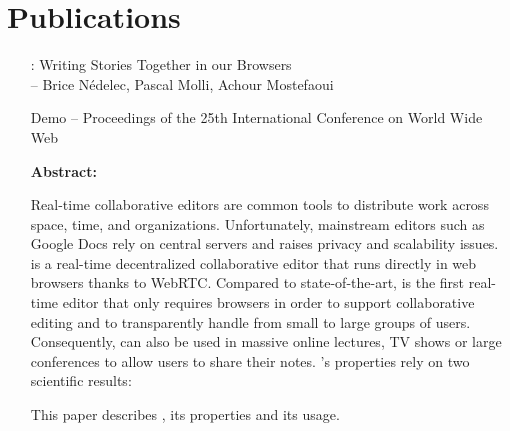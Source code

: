 
\section{Publications}

\begin{itemize}
\item [\CRATE: Writing Stories Together in our Browsers]\ \\
  -- Brice Nédelec, Pascal Molli, Achour Mostefaoui
\item [Demo -- Proceedings of the 25th International Conference on World Wide
  Web]
\item [\textbf{Abstract:}] {\small Real-time collaborative editors are common
    tools to distribute work across space, time, and
    organizations. Unfortunately, mainstream editors such as Google Docs rely on
    central servers and raises privacy and scalability issues.  \CRATE is a
    real-time decentralized collaborative editor that runs directly in web
    browsers thanks to WebRTC. Compared to state-of-the-art, \CRATE is the first
    real-time editor that only requires browsers in order to support
    collaborative editing and to transparently handle from small to large groups
    of users. Consequently, \CRATE can also be used in massive online lectures,
    TV shows or large conferences to allow users to share their notes. \CRATE's
    properties rely on two scientific results:
  This paper describes \CRATE, its properties and its usage.}
\end{itemize}

